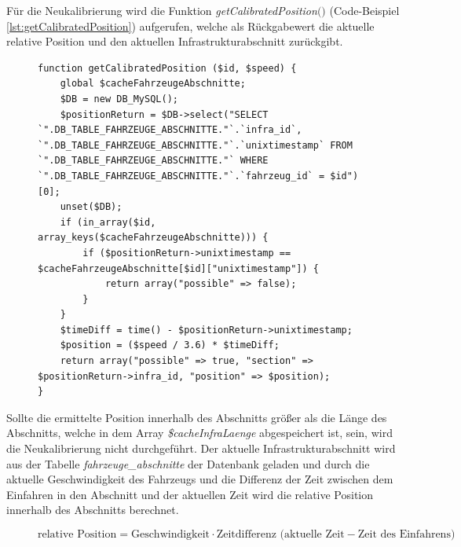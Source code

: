 Für die Neukalibrierung wird die Funktion \textit{getCalibratedPosition$($$)$} (Code-Beispiel \ref{lst:getCalibratedPosition}) aufgerufen, welche als Rückgabewert die aktuelle relative Position und den aktuellen Infrastrukturabschnitt zurückgibt.
\begin{figure}
\begin{lstlisting}[caption={\textit{getCalibratedPosition$($$)$} (main.php)},captionpos=b,label={lst:getCalibratedPosition}]
function getCalibratedPosition ($id, $speed) {
	global $cacheFahrzeugeAbschnitte;
	$DB = new DB_MySQL();
	$positionReturn = $DB->select("SELECT `".DB_TABLE_FAHRZEUGE_ABSCHNITTE."`.`infra_id`, `".DB_TABLE_FAHRZEUGE_ABSCHNITTE."`.`unixtimestamp` FROM `".DB_TABLE_FAHRZEUGE_ABSCHNITTE."` WHERE `".DB_TABLE_FAHRZEUGE_ABSCHNITTE."`.`fahrzeug_id` = $id")[0];
	unset($DB);
	if (in_array($id, array_keys($cacheFahrzeugeAbschnitte))) {
		if ($positionReturn->unixtimestamp == $cacheFahrzeugeAbschnitte[$id]["unixtimestamp"]) {
			return array("possible" => false);
		}
	}
	$timeDiff = time() - $positionReturn->unixtimestamp;
	$position = ($speed / 3.6) * $timeDiff;
	return array("possible" => true, "section" => $positionReturn->infra_id, "position" => $position);
}
\end{lstlisting}
\end{figure}
Sollte die ermittelte Position innerhalb des Abschnitts größer als die Länge des Abschnitts, welche in dem Array \textit{\$cacheInfraLaenge} abgespeichert ist, sein, wird die Neukalibrierung nicht durchgeführt. Der aktuelle Infrastrukturabschnitt wird aus der Tabelle \textit{fahrzeuge\_abschnitte} der Datenbank geladen und durch die aktuelle Geschwindigkeit des Fahrzeugs und die Differenz der Zeit zwischen dem Einfahren in den Abschnitt und der aktuellen Zeit wird die relative Position innerhalb des Abschnitts berechnet.
\begin{figure}
\[\textrm{relative Position} = \textrm{Geschwindigkeit} \cdot \textrm{Zeitdifferenz (aktuelle Zeit} - \textrm{Zeit des Einfahrens)}\]
\end{figure}
